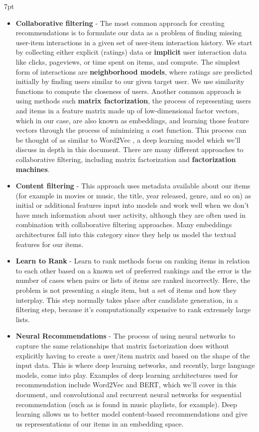 \documentclass[11pt, table]{diazessay} %
\newenvironment{formal}{%
  \def\FrameCommand{%
	\hspace{1pt}%
	{\color{w_lightblue}\vrule width 2pt}%
	{\color{formalshade}\vrule width 4pt}%
	\colorbox{formalshade}%
  }%
  \MakeFramed{\advance\hsize-\width\FrameRestore}%
  \noindent\hspace{-4.55pt}%
  \begin{adjustwidth}{}{7pt}%
  \vspace{2pt}\vspace{2pt}%
}
{%
  \vspace{2pt}\end{adjustwidth}\endMakeFramed%
}
\begin{document}
\begin{sloppypar}
\begin{formal}
\begin{itemize}
  \item \textbf{Collaborative filtering} - The most common approach for creating recommendations is to formulate our data as a problem of finding missing user-item interactions in a given set of user-item interaction history. We start by collecting either explicit (ratings) data or \textbf{implicit} user interaction data like clicks, pageviews, or time spent on items, and compute. The simplest form of interactions are \textbf{neighborhood models}, where ratings are predicted initially by finding users similar to our given target user. We use similarity functions to compute the closeness of users.
  Another common approach is using methods such  \textbf{matrix factorization}, the process of representing users and items in a feature matrix made up of low-dimensional factor vectors, which in our case, are also known as embeddings, and learning those feature vectors through the process of minimizing a cost function. This process can be thought of as similar to Word2Vec \citep{levy2014neural}, a deep learning model which we'll discuss in depth in this document.  There are many different approaches to collaborative filtering, including matrix factorization and  \textbf{factorization machines}.
   \item \textbf{Content filtering} - This approach uses metadata available about our items (for example in movies or music, the title, year released, genre, and so on) as initial or additional features input into models and work well when we don't have much information about user activity, although they are often used in combination with collaborative filtering approaches. Many embeddings architectures fall into this category since they help us model the textual features for our items.  
  \item \textbf{Learn to Rank} -  Learn to rank methods focus on ranking items in relation to each other based on a known set of preferred rankings and the error is the number of cases when pairs or lists of items are ranked incorrectly. Here, the problem is not presenting a single item, but a set of items and how they interplay. This step normally takes place after candidate generation, in a filtering step, because it's computationally expensive to rank extremely large lists.
  \item \textbf{Neural Recommendations} - The process of using neural networks to capture the same relationships that matrix factorization does without explicitly having to create a user/item matrix and based on the shape of the input data. This is where deep learning networks, and recently, large language models, come into play. Examples of deep learning architectures used for recommendation include Word2Vec and BERT, which we'll cover in this document, and convolutional and recurrent neural networks for sequential recommendation (such as is found in music playlists, for example). Deep learning allows us to better model content-based recommendations and give us representations of our items in an embedding space. \citep{zhang2019deep}
\end{itemize}
\end{formal}


\end{sloppypar}
\end{document}
